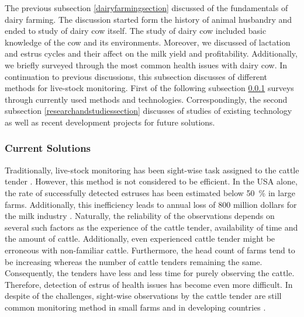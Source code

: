 \documentclass[english,12pt,a4paper,pdftex,elec,utf8]{aaltothesis}
\begin{document}
The previous subsection \ref{dairyfarmingsection} discussed of the fundamentals of dairy farming. The discussion started form the history of animal husbandry and ended to study of dairy cow itself. The study of dairy cow included basic knowledge of the cow and its environments. Moreover, we discussed of lactation and estrus cycles and their affect on the milk yield and profitability. Additionally, we briefly surveyed through the most common health issues with dairy cow. In continuation to previous discussions, this subsection discusses of different methods for live-stock monitoring. First of the following subsection \ref{currentsolutionssection} surveys through currently used methods and technologies. Correspondingly, the second subsection \ref{researchandstudiessection} discusses of studies of existing technology as well as recent development projects for future solutions.  


\subsubsection{Current Solutions} \label{currentsolutionssection}

Traditionally, live-stock monitoring has been sight-wise task assigned to the cattle tender \cite{lehmahavaintoja}. However, this method is not considered to be efficient. In the USA alone, the rate of successfully detected estruses has been estimated below \SI{50}{\percent} in large farms. Additionally, this inefficiency leads to annual loss of 800 million dollars for the milk industry \cite{BRUNASSI2010}. Naturally, the reliability of the observations depends on several such factors as the experience of the cattle tender, availability of time and the amount of cattle. Additionally, even experienced cattle tender might be erroneous with non-familiar cattle. Furthermore, the head count of farms tend to be increasing whereas the number of cattle tenders remaining the same. Consequently, the tenders have less and less time for purely observing the cattle. Therefore, detection of estrus of health issues has become even more difficult. In despite of the challenges, sight-wise observations by the cattle tender are still common monitoring method in small farms and in developing countries \cite{BRUNASSI2010}. 
\end{document}
